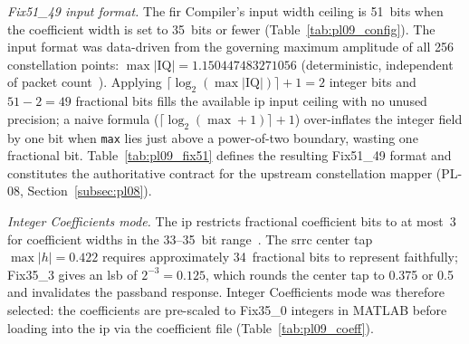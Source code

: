 \textit{Fix51\_49 input format.}
The \ac{fir} Compiler's input width ceiling is 51~bits when the
coefficient width is set to 35~bits or fewer (Table~\ref{tab:pl09_config}).
The input format was data-driven from the governing maximum
amplitude of all 256 constellation points:
$\max|\text{IQ}| = 1.150447483271056$
(deterministic, independent of packet count~\cite{ITU_J83}).
Applying $\lceil\log_2(\max|\text{IQ}|)\rceil + 1 = 2$ integer bits and
$51 - 2 = 49$ fractional bits fills the available \ac{ip} input ceiling
with no unused precision; a naive formula ($\lceil\log_2(\max+1)\rceil + 1$)
over-inflates the integer field by one bit when \texttt{max} lies just
above a power-of-two boundary, wasting one fractional bit.
Table~\ref{tab:pl09_fix51} defines the resulting Fix51\_49 format and
constitutes the authoritative contract for the upstream constellation
mapper (PL-08, Section~\ref{subsec:pl08}).

\textit{Integer Coefficients mode.}
The \ac{ip} restricts fractional coefficient bits to at most~3 for
coefficient widths in the 33--35~bit range~\cite{AMD_PG149}.
The \ac{srrc} center tap $\max|h| = 0.422$ requires approximately
34~fractional bits to represent faithfully; Fix35\_3 gives an \ac{lsb}
of $2^{-3} = 0.125$, which rounds the center tap to 0.375 or 0.5
and invalidates the passband response.
Integer Coefficients mode was therefore selected: the coefficients are
pre-scaled to Fix35\_0 integers in MATLAB before loading into the \ac{ip}
via the coefficient file (Table~\ref{tab:pl09_coeff}).


